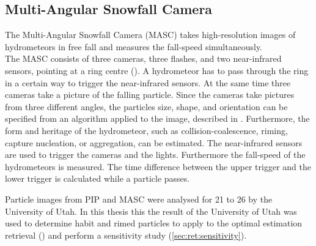 \subsection{Multi-Angular Snowfall Camera}

The Multi-Angular Snowfall Camera (MASC) takes high-resolution images of hydrometeors in free fall and measures the fall-speed simultaneously. \\
The MASC consists of three cameras, three flashes, and two near-infrared sensors, pointing at a ring centre (). A hydrometeor has to pass through the ring in a certain way to trigger the near-infrared sensors. At the same time three cameras take a picture of the falling particle. Since the cameras take pictures from three different angles, the particles size, shape, and orientation can be specified from an algorithm applied to the image, described in \citet{garrett_fall_2012}. Furthermore, the form and heritage of the hydrometeor, such as collision-coalescence, riming, capture nucleation, or aggregation, can be estimated. The near-infrared sensors are used to trigger the cameras and the lights. Furthermore the fall-speed of the hydrometeors is measured. The time difference between the upper trigger and the lower trigger is calculated while a particle passes.
\par\medskip\noindent
Particle images from PIP and MASC were analysed for \num{21} to \SI{26}{\dec} by the University of Utah. In this thesis this the result of the University of Utah was used to determine habit and rimed particles to apply to the optimal estimation retrieval () and perform a sensitivity study (\ref{sec:ret:sensitivity}).

